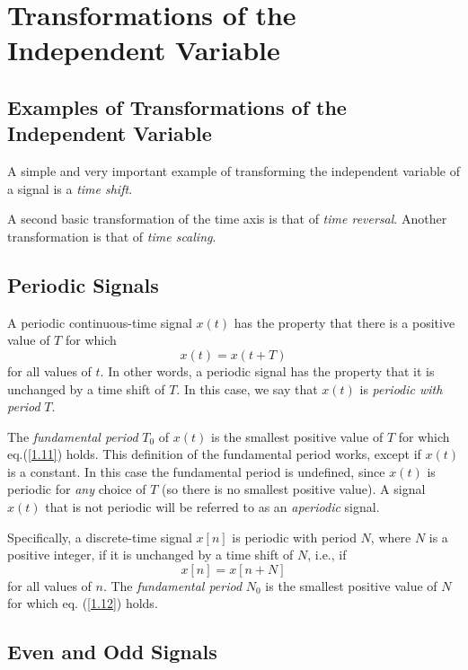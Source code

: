 \documentclass[a4paper,10pt,twoside]{book}
\begin{document}
\section{Transformations of the Independent Variable}
\subsection{Examples of Transformations of the Independent Variable}

A simple and very important example of transforming the independent variable of a signal is a \textit{time shift}.

A second basic transformation of the time axis is that of \textit{time reversal}. Another transformation is that of \textit{time scaling}.

\subsection{Periodic Signals}

A periodic continuous-time signal $x(t)$ has the property that there is a positive value of $T$ for which
\begin{equation}
    x(t)=x(t+T)
    \label{1.11}
\end{equation}
for all values of $t$. In other words, a periodic signal has the property that it is unchanged by a time shift of $T$. In this case, we say that $x(t)$ is \textit{periodic with period} $T$.

The \textit{fundamental period} $T_0$ of $x(t)$ is the smallest positive value of $T$ for which eq.\;(\ref{1.11}) holds. This definition of the fundamental period works, except if $x(t)$ is a constant. In this case the fundamental period is undefined, since $x(t)$ is periodic for \textit{any} choice of $T$ (so there is no smallest positive value). A signal $x(t)$ that is not periodic will be referred to as an \textit{aperiodic} signal.

Specifically, a discrete-time signal $x[n]$ is periodic with period $N$, where $N$ is a positive integer, if it is unchanged by a time shift of $N$, i.e., if
\begin{equation}
    x[n]=x[n+N]
    \label{1.12}
\end{equation}
for all values of $n$. The \textit{fundamental period} $N_0$ is the smallest positive value of $N$ for which eq. (\ref{1.12}) holds.

\subsection{Even and Odd Signals}
\end{document}
